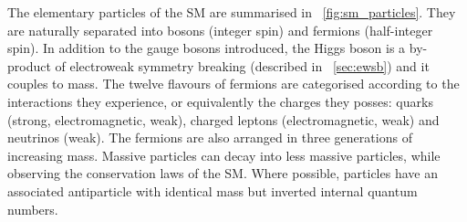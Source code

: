 The elementary particles of the \ac{SM} are summarised in \Figure~\ref{fig:sm_particles}.
They are naturally separated into bosons (integer spin) and fermions (half-integer spin).
In addition to the gauge bosons introduced, the Higgs boson is a by-product
of electroweak symmetry breaking (described in \Section~\ref{sec:ewsb}) and it couples to 
mass. The twelve flavours of fermions are categorised according to the interactions they 
experience, or equivalently the charges they posses: quarks (strong, electromagnetic, 
weak), charged leptons (electromagnetic, weak) and neutrinos (weak). The fermions are also 
arranged in three generations of increasing mass. Massive particles can decay into less 
massive particles, while observing the conservation laws of the \ac{SM}. Where possible, 
particles have an associated antiparticle with identical mass but inverted internal 
quantum numbers.
